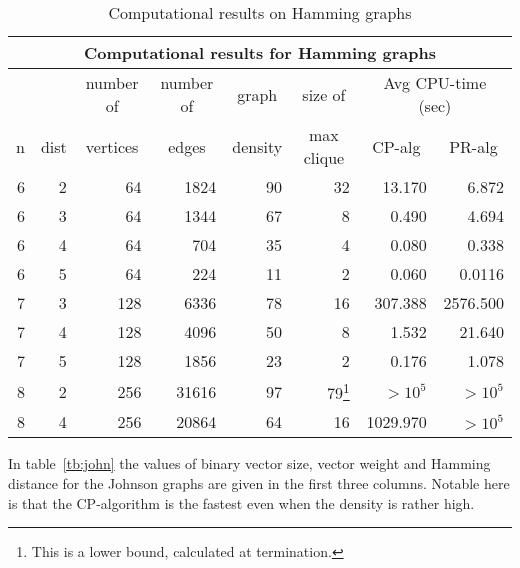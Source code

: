 \begin{table}[bth]
\centering
\scriptsize
\begin{minipage}{11.1cm}
\begin{tabular}{||r|r|r|r|r|r|r|r||}
\hline
\multicolumn{8}{|c|}{Computational results for Hamming graphs} \\
\hline \hline
& & \multicolumn{1}{c|}{number of} &
\multicolumn{1}{c|}{number of} &
\multicolumn{1}{c|}{graph} &
\multicolumn{1}{c|}{size of} &
\multicolumn{2}{c|}{Avg CPU-time {\tiny (sec)}} \\ \cline{7-8}
\multicolumn{1}{||c|}{n} &
\multicolumn{1}{|c|}{dist} &
\multicolumn{1}{|c|}{vertices} &
\multicolumn{1}{|c|}{edges} &
\multicolumn{1}{|c|}{density} & 
\multicolumn{1}{|c|}{max clique} &
\multicolumn{1}{|c|}{CP-alg} &
\multicolumn{1}{|c||}{PR-alg} \\
\hline
6 & 2 & 64 & 1824 & 90 & 32 & 13.170 & 6.872\\
6 & 3 & 64 & 1344 & 67 & 8 & 0.490 & 4.694 \\
6 & 4 & 64 & 704 & 35 & 4 & 0.080 & 0.338 \\ 
6 & 5 & 64 & 224 & 11 & 2 & 0.060 & 0.0116 \\ 
7 & 3 & 128 & 6336 & 78 & 16 & 307.388 & 2576.500 \\ 
7 & 4 & 128 & 4096 & 50 & 8 & 1.532 & 21.640 \\ 
7 & 5 & 128 & 1856 & 23 & 2 & 0.176 & 1.078 \\ 
8 & 2 & 256 & 31616 & 97 & 79\footnote{This is a lower bound, 
                                       calculated at termination.}
                            & $> 10^{5}$ & $> 10^{5}$ \\
8 & 4 & 256 & 20864 & 64 & 16 & 1029.970 & $> 10^{5}$\\
\hline
\end{tabular}
\end{minipage}
\caption{Computational results on Hamming graphs}
\label{tb:hamm}
\end{table}

In table~\ref{tb:john} the values of binary vector size, vector weight and
Hamming distance for the Johnson graphs are given in the first three columns.
Notable here is that the CP-algorithm is the fastest even when the density is
rather high.

